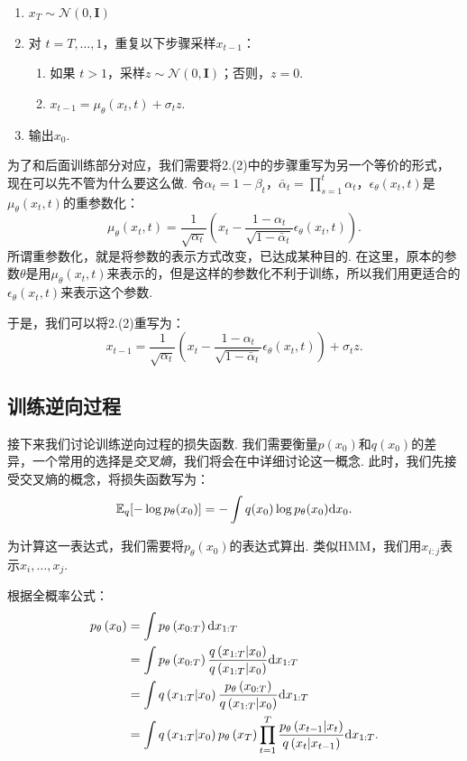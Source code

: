 \begin{enumerate}
    \item $x_T \sim \mathcal{N}(0, \mathbf{I})$
    \item 对 $t = T, \ldots, 1$，重复以下步骤采样$x_{t-1}$：
    \begin{enumerate}
        \item 如果 $t>1$，采样$z \sim \mathcal{N}(0, \mathbf{I})$；否则，$z = 0$.
        \item $x_{t-1} = \mu_\theta(x_t,t) + \sigma_t z$.
    \end{enumerate}
    \item 输出$x_0$.
\end{enumerate}

为了和后面训练部分对应，我们需要将2.(2)中的步骤重写为另一个等价的形式，现在可以先不管为什么要这么做. 令$\alpha_t=1-\beta_t$，$\bar\alpha_t=\prod_{s=1}^t\alpha_t$，$\epsilon_\theta(x_t, t)$是$\mu_\theta(x_t,t)$的重参数化：
\[
\mu_{\theta}(x_t, t) =  \frac{1}{\sqrt{\alpha_t}} \left( x_t - \frac{1-\alpha_t}{\sqrt{1 - \bar{\alpha}_t}}\epsilon_{\theta}(x_t, t) \right).
\]
所谓重参数化，就是将参数的表示方式改变，已达成某种目的. 在这里，原本的参数$\theta$是用$\mu_\theta(x_t,t)$来表示的，但是这样的参数化不利于训练，所以我们用更适合的$\epsilon_\theta(x_t,t)$来表示这个参数.

于是，我们可以将2.(2)重写为：
\[x_{t-1} = \frac{1}{\sqrt{\alpha_t}} \left( x_t - \frac{1-\alpha_t}{\sqrt{1-\bar\alpha_t}} \epsilon_\theta(x_t, t) \right) + \sigma_t z.\]


\subsection{训练逆向过程}

接下来我们讨论训练逆向过程的损失函数. 我们需要衡量$p(x_0)$和$q(x_0)$的差异，一个常用的选择是\textit{交叉熵}，我们将会在中详细讨论这一概念. 此时，我们先接受交叉熵的概念，将损失函数写为：
\[
\mathbb{E}_q[-\log p_\theta(x_0)]=-\int q(x_0)\log p_\theta(x_0)\mathrm{d} x_0.
\]

为计算这一表达式，我们需要将$p_\theta(x_0)$的表达式算出. 类似HMM，我们用$x_{i:j}$表示$x_i,\dots,x_j$. 

根据全概率公式：
\[
    \begin{aligned}
        p_\theta\left(x_{0}\right)&=\int  p_\theta\left(x_{0:T}\right) \mathrm{d}  x_{1:T}\\
            &= \int p_\theta\left(x_{0:T}\right) \frac{q\left(x_{1:T} | x_{0}\right)}{q\left(x_{1:T} | x_{0}\right)} \mathrm{d}  x_{1:T} \\
        &= \int q\left(x_{1:T} | x_{0}\right) \frac{p_\theta\left(x_{0:T}\right)}{q\left(x_{1:T} | x_{0}\right)} \mathrm{d}  x_{1:T} \\
        &= \int q\left(x_{1:T} | x_{0}\right) p_\theta\left(x_{T}\right) \prod_{t=1}^T \frac{p_\theta\left(x_{t-1} | x_{t}\right)}{q\left(x_{t} | x_{t-1}\right)}\mathrm{d}  x_{1:T}.
    \end{aligned}    
\]

